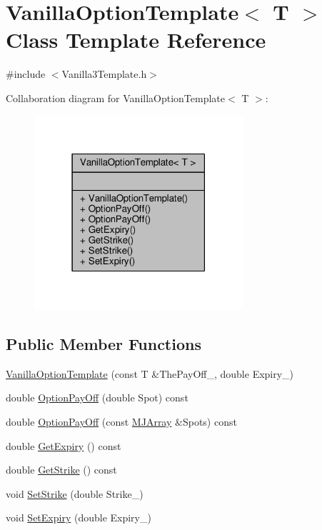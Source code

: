 \hypertarget{classVanillaOptionTemplate}{}\section{Vanilla\+Option\+Template$<$ T $>$ Class Template Reference}
\label{classVanillaOptionTemplate}


{\ttfamily \#include $<$Vanilla3\+Template.\+h$>$}



Collaboration diagram for Vanilla\+Option\+Template$<$ T $>$\+:
\nopagebreak
\begin{figure}[H]
\begin{center}
\leavevmode
\includegraphics[width=219pt]{classVanillaOptionTemplate__coll__graph}
\end{center}
\end{figure}
\subsection*{Public Member Functions}
\begin{DoxyCompactItemize}
\item 
\hyperlink{classVanillaOptionTemplate_aa9e647d7387fa1c176bead8453bb5306}{Vanilla\+Option\+Template} (const T \&The\+Pay\+Off\+\_\+, double Expiry\+\_\+)
\item 
double \hyperlink{classVanillaOptionTemplate_ac355bde544ec2ea3779e12e5595d4788}{Option\+Pay\+Off} (double Spot) const
\item 
double \hyperlink{classVanillaOptionTemplate_ab9298da63689b7560b45ca564ac74796}{Option\+Pay\+Off} (const \hyperlink{classMJArray}{M\+J\+Array} \&Spots) const
\item 
double \hyperlink{classVanillaOptionTemplate_aab07d3a8f5a04c637711ce5b1455d8c7}{Get\+Expiry} () const
\item 
double \hyperlink{classVanillaOptionTemplate_a55cddd46a88edc4cde4055e21a627293}{Get\+Strike} () const
\item 
void \hyperlink{classVanillaOptionTemplate_abb71fbe2909498c8bdf5ae49c6cc73e0}{Set\+Strike} (double Strike\+\_\+)
\item 
void \hyperlink{classVanillaOptionTemplate_abb063fb080d0fda77233f370991c941e}{Set\+Expiry} (double Expiry\+\_\+)
\end{DoxyCompactItemize}


